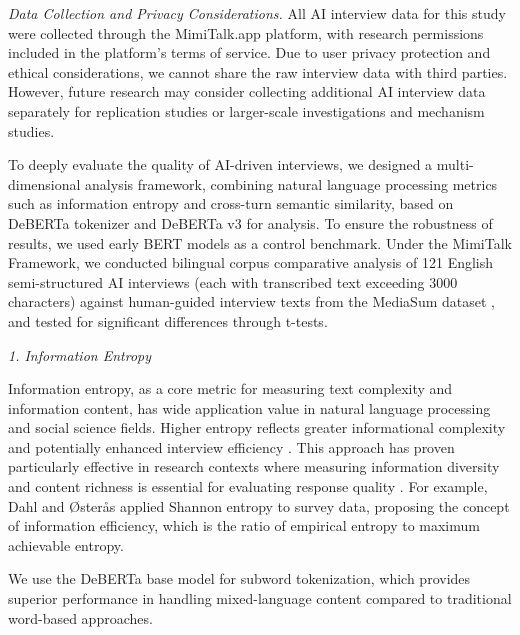 \documentclass[sigchi,nonacm,manuscript]{acmart}
\begin{document}
\textit{Data Collection and Privacy Considerations.} All AI interview data for this study were collected through the MimiTalk.app platform, with research permissions included in the platform's terms of service. Due to user privacy protection and ethical considerations, we cannot share the raw interview data with third parties. However, future research may consider collecting additional AI interview data separately for replication studies or larger-scale investigations and mechanism studies.

To deeply evaluate the quality of AI-driven interviews, we designed a multi-dimensional analysis framework, combining natural language processing metrics such as information entropy and cross-turn semantic similarity, based on DeBERTa tokenizer \citep{heDeBERTaDecodingenhancedBERT2020} and DeBERTa v3 \citep{heDeBERTaV3ImprovingDeBERTa2021} for analysis. To ensure the robustness of results, we used early BERT models \citep{devlinBERTPretrainingDeep2018} as a control benchmark. Under the MimiTalk Framework, we conducted bilingual corpus comparative analysis of 121 English semi-structured AI interviews (each with transcribed text exceeding 3000 characters) against human-guided interview texts from the MediaSum dataset \citep{zhuMediaSumLargescaleMedia2021}, and tested for significant differences through t-tests. 

\textit{1. Information Entropy}

Information entropy, as a core metric for measuring text complexity and information content, has wide application value in natural language processing and social science fields. Higher entropy reflects greater informational complexity and potentially enhanced interview efficiency \citep{dahlQuantifyingInformationContent2010, friesnerInformationEntropyScale2021}. This approach has proven particularly effective in research contexts where measuring information diversity and content richness is essential for evaluating response quality \citep{homolaMeasureSurveyMode2016, keykhaAdvantagesChallengesElectronic2025}. For example, Dahl and Østerås \citep{dahlQuantifyingInformationContent2010} applied Shannon entropy to survey data, proposing the concept of information efficiency, which is the ratio of empirical entropy to maximum achievable entropy.

We use the DeBERTa base model \citep{heDeBERTaDecodingenhancedBERT2020} for subword tokenization, which provides superior performance in handling mixed-language content compared to traditional word-based approaches.
\end{document}
